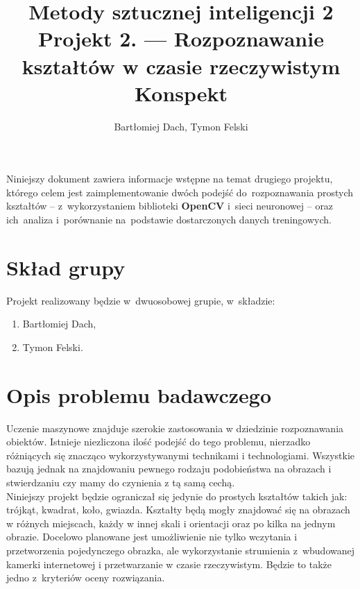 \documentclass[11pt,a4paper]{article}
\begin{document}
\title{Metody sztucznej inteligencji 2 \\
\Large{
    Projekt 2. --- Rozpoznawanie kształtów w czasie rzeczywistym \\
    Konspekt
}}
\author{Bartłomiej Dach, Tymon Felski}
\maketitle

\noindent
Niniejszy dokument zawiera informacje wstępne na temat drugiego projektu, którego celem jest zaimplementowanie dwóch podejść do~rozpoznawania prostych kształtów -- z~wykorzystaniem biblioteki \textbf{OpenCV} i~sieci neuronowej -- oraz ich~analiza i~porównanie na~podstawie dostarczonych danych treningowych.

\section{Skład grupy}

Projekt realizowany będzie w~dwuosobowej grupie, w~składzie:
\begin{enumerate}
    \setlength\itemsep{-.4em}
    \item Bartłomiej Dach,
    \item Tymon Felski.
\end{enumerate}

\section{Opis problemu badawczego}

Uczenie maszynowe znajduje szerokie zastosowania w dziedzinie rozpoznawania obiektów. Istnieje niezliczona ilość podejść do tego problemu, nierzadko różniących się znacząco wykorzystywanymi technikami i technologiami. Wszystkie bazują jednak na znajdowaniu pewnego rodzaju podobieństwa na obrazach i stwierdzaniu czy mamy do czynienia z tą samą cechą.\\

Niniejszy projekt będzie ograniczał się jedynie do prostych kształtów takich jak: trójkąt, kwadrat, koło, gwiazda. Kształty będą mogły znajdować się na obrazach w różnych miejscach, każdy w innej skali i orientacji oraz po kilka na jednym obrazie. Docelowo planowane jest umożliwienie nie tylko wczytania i przetworzenia pojedynczego obrazka, ale wykorzystanie strumienia z~wbudowanej kamerki internetowej i przetwarzanie w czasie rzeczywistym. Będzie to także jedno z~kryteriów oceny rozwiązania.
\end{document}
